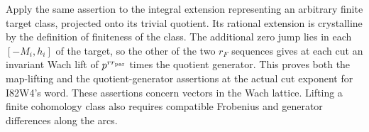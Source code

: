 Apply the same assertion to the integral extension representing
an arbitrary finite target class, projected onto its trivial
quotient. Its rational extension is crystalline by the definition
of finiteness of the class. The additional zero jump lies in each
$[-M_i,h_i]$ of the target, so the other of the two $r_F$ sequences
gives at each cut an invariant Wach lift of $p^{rr_{\rm par}}$
times the quotient generator. This proves both the map-lifting
and the quotient-generator assertions at the actual cut exponent
for I82W4's word. These assertions concern vectors in the Wach
lattice. Lifting a finite cohomology class also requires compatible
Frobenius and generator differences along the arcs.
